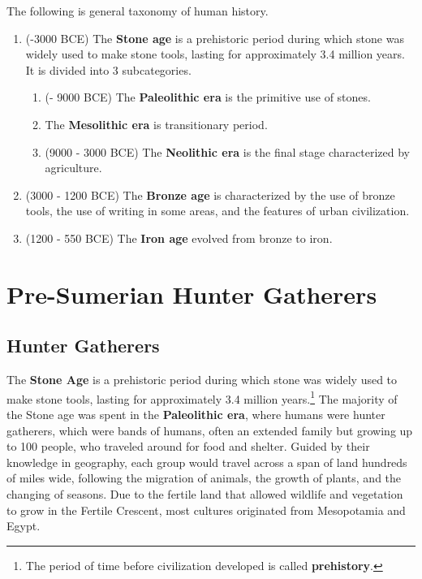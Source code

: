 \documentclass{article}
\begin{document}
  \begin{definition}
    \label{def:general-timeline}
    The following is general taxonomy of human history. 
    \begin{enumerate} 
      \item (-3000 BCE) The \textbf{Stone age} is a prehistoric period during which stone was widely used to make stone tools, lasting for approximately 3.4 million years. It is divided into 3 subcategories. 
        \begin{enumerate}
          \item (- 9000 BCE) The \textbf{Paleolithic era} is the primitive use of stones. 
          \item The \textbf{Mesolithic era} is transitionary period. 
          \item (9000 - 3000 BCE) The \textbf{Neolithic era} is the final stage characterized by agriculture. 
        \end{enumerate}
      \item (3000 - 1200 BCE) The \textbf{Bronze age} is characterized by the use of bronze tools, the use of writing in some areas, and the features of urban civilization. 
      \item (1200 - 550 BCE) The \textbf{Iron age} evolved from bronze to iron. 
    \end{enumerate}
  \end{definition}

\section{Pre-Sumerian Hunter Gatherers}

  \subsection{Hunter Gatherers}

    The \textbf{Stone Age} is a prehistoric period during which stone was widely used to make stone tools, lasting for approximately 3.4 million years.\footnote{The period of time before civilization developed is called \textbf{prehistory}. } The majority of the Stone age was spent in the \textbf{Paleolithic era}, where humans were hunter gatherers, which were bands of humans, often an extended family but growing up to 100 people, who traveled around for food and shelter. Guided by their knowledge in geography, each group would travel across a span of land hundreds of miles wide, following the migration of animals, the growth of plants, and the changing of seasons. Due to the fertile land that allowed wildlife and vegetation to grow in the Fertile Crescent, most cultures originated from Mesopotamia and Egypt. 
\end{document}
